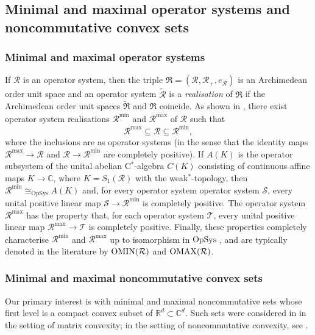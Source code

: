 \documentclass{amsart}
\theoremstyle{definition}
\theoremstyle{remark}
\newcommand\osr{{\mathcal R}}
\newcommand\oss{{\mathcal S}}
\newcommand\ost{{\mathcal T}}
\numberwithin{equation}{section}
\begin{document}
\subsection{Minimal and maximal operator systems and noncommutative convex sets}

\subsubsection{Minimal and maximal operator systems}
If $\osr$ is an operator system, then the triple $\mathfrak R=(\osr, \osr_+,e_\osr)$
is an Archimedean order unit space and an operator system $\tilde\osr$ is a \emph{realisation} of $\mathfrak R$ if
the Archimedean order unit spaces $\tilde{\mathfrak R}$ and $\mathfrak R$ coincide. As shown in \cite[\S3]{paulsen--todorov--tomforde2010},
there exist operator system realisations $\osr^{\textrm{min}}$ and $\osr^{\textrm{max}}$ of $\osr$ such that
\begin{equation}\label{e:omax-omin}
\osr^{\textrm{max}} \subseteq \osr \subseteq \osr^{\min},
\end{equation}
where the inclusions are as operator systems (in the sense that the identity maps $\osr^{\textrm{max}} \rightarrow \osr$ and $\osr  \rightarrow \osr^{\textrm{min}}$ are
completely positive). If $A(K)$ is the operator subsystem of the unital abelian C$^*$-algebra $C(K)$ consisting of continuous affine maps
$K\rightarrow\mathbb C$, where $K=S_1(\osr)$ 
with the weak$^*$-topology, then $\osr^{\textrm{min}}\cong_{\textrm{OpSys}}A(K)$ and, for every operator system operator system $\oss$,
every unital positive linear map $\oss\rightarrow\osr^{\textrm{min}}$ is completely positive.
The operator system $\osr^{\textrm{max}} $ has the property that, for each operator system $\ost$, every unital
positive linear map $\osr^{\textrm{max}} \rightarrow \ost$ is completely positive. Finally, these properties completely characterise $\osr^{\textrm{min}}$ and $\osr^{\textrm{max}}$ up to 
isomorphism in ${\textrm{OpSys}}$ \cite[Theorems 3.4 and 3.22]{paulsen--todorov--tomforde2010}, and are typically denoted in the literature by 
$\mbox{\textrm OMIN}(\osr)$ and $\mbox{\textrm OMAX}(\osr)$. 


\subsubsection{Minimal and maximal noncommutative convex sets}
Our primary interest is with minimal and maximal noncommutative sets whose first level is a compact convex subset of $\mathbb R^d\subset\mathbb C^d$.
Such sets were considered in \cite{davisdon--dor-on--shalit--solel2017,passer--shalit--solel2018} in the setting of matrix convexity; in the setting of
noncommutative convexity, see \cite{blecher--mcclure2026}.
\end{document}
